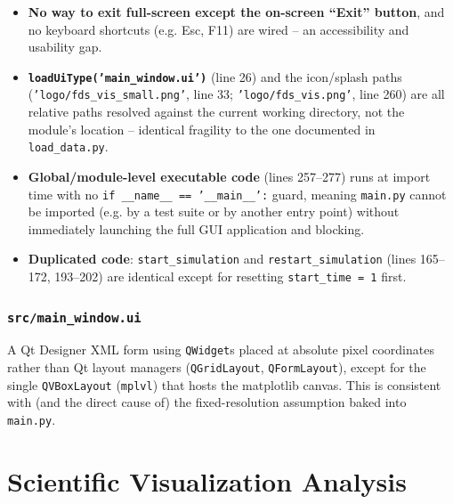 \documentclass[11pt,a4paper]{report}
\begin{document}
\begin{itemize}[nosep]
calls \texttt{self.showFullScreen()} unconditionally (line 32) and re-enters full screen on any
double-click (\texttt{mouseDoubleClickEvent}, lines 162--163). On any monitor other than exactly
1920$\times$1080/1100, widgets will be cropped, misaligned, or leave dead space -- there is no layout
manager (\texttt{QVBoxLayout}/\texttt{QGridLayout}) used for the top-level widgets, only for the
matplotlib canvas container (\texttt{mplvl}).
\item \textbf{No way to exit full-screen except the on-screen ``Exit'' button}, and no keyboard
shortcuts (e.g. Esc, F11) are wired -- an accessibility and usability gap.
\item \textbf{\texttt{loadUiType('main\_window.ui')}} (line 26) and the icon/splash paths
(\texttt{'logo/fds\_vis\_small.png'}, line 33; \texttt{'logo/fds\_vis.png'}, line 260) are all relative
paths resolved against the current working directory, not the module's location -- identical fragility
to the one documented in \texttt{load\_data.py}.
\item \textbf{Global/module-level executable code} (lines 257--277) runs at import time with no
\texttt{if \_\_name\_\_ == '\_\_main\_\_':} guard, meaning \texttt{main.py} cannot be imported (e.g.
by a test suite or by another entry point) without immediately launching the full GUI application and
blocking.
\item \textbf{Duplicated code}: \texttt{start\_simulation} and \texttt{restart\_simulation} (lines
165--172, 193--202) are identical except for resetting \texttt{start\_time = 1} first.
\end{itemize}

\subsection{\texttt{src/main\_window.ui}}
A Qt Designer XML form using \texttt{QWidget}s placed at absolute pixel coordinates rather than
Qt layout managers (\texttt{QGridLayout}, \texttt{QFormLayout}), except for the single
\texttt{QVBoxLayout} (\texttt{mplvl}) that hosts the matplotlib canvas. This is consistent with
(and the direct cause of) the fixed-resolution assumption baked into \texttt{main.py}.

\chapter{Scientific Visualization Analysis}
\end{document}
